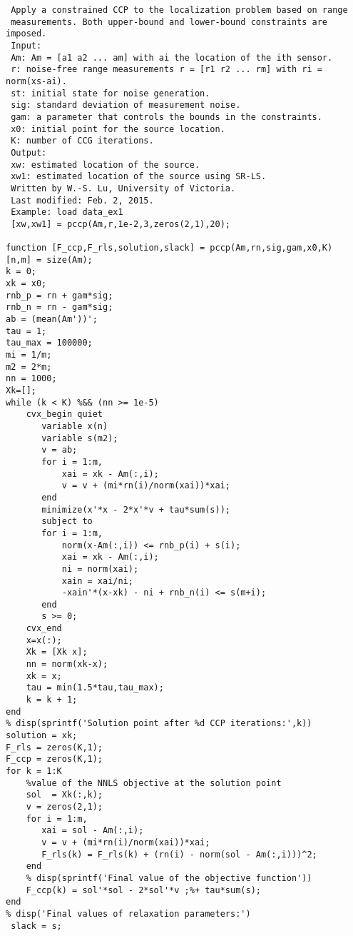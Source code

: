 \begin{lstlisting}
 Apply a constrained CCP to the localization problem based on range
 measurements. Both upper-bound and lower-bound constraints are imposed.
 Input:
 Am: Am = [a1 a2 ... am] with ai the location of the ith sensor.
 r: noise-free range measurements r = [r1 r2 ... rm] with ri = norm(xs-ai).
 st: initial state for noise generation.
 sig: standard deviation of measurement noise.
 gam: a parameter that controls the bounds in the constraints.
 x0: initial point for the source location.
 K: number of CCG iterations.
 Output:
 xw: estimated location of the source.
 xw1: estimated location of the source using SR-LS.
 Written by W.-S. Lu, University of Victoria.
 Last modified: Feb. 2, 2015.
 Example: load data_ex1
 [xw,xw1] = pccp(Am,r,1e-2,3,zeros(2,1),20);
 
function [F_ccp,F_rls,solution,slack] = pccp(Am,rn,sig,gam,x0,K)
[n,m] = size(Am);
k = 0;
xk = x0;
rnb_p = rn + gam*sig;
rnb_n = rn - gam*sig;
ab = (mean(Am'))';
tau = 1;
tau_max = 100000;
mi = 1/m;
m2 = 2*m;
nn = 1000;
Xk=[];
while (k < K) %&& (nn >= 1e-5)
    cvx_begin quiet
       variable x(n)
       variable s(m2);
       v = ab;
       for i = 1:m,
           xai = xk - Am(:,i);
           v = v + (mi*rn(i)/norm(xai))*xai;
       end
       minimize(x'*x - 2*x'*v + tau*sum(s));
       subject to
       for i = 1:m,
           norm(x-Am(:,i)) <= rnb_p(i) + s(i);
           xai = xk - Am(:,i);
           ni = norm(xai);
           xain = xai/ni;
           -xain'*(x-xk) - ni + rnb_n(i) <= s(m+i);
       end
       s >= 0;
    cvx_end
    x=x(:);
    Xk = [Xk x];
    nn = norm(xk-x);
    xk = x;
    tau = min(1.5*tau,tau_max);
    k = k + 1;
end
% disp(sprintf('Solution point after %d CCP iterations:',k))
solution = xk;
F_rls = zeros(K,1);
F_ccp = zeros(K,1);
for k = 1:K
    %value of the NNLS objective at the solution point
    sol  = Xk(:,k);
    v = zeros(2,1);
    for i = 1:m,
       xai = sol - Am(:,i);
       v = v + (mi*rn(i)/norm(xai))*xai;
       F_rls(k) = F_rls(k) + (rn(i) - norm(sol - Am(:,i)))^2;
    end
    % disp(sprintf('Final value of the objective function'))
    F_ccp(k) = sol'*sol - 2*sol'*v ;%+ tau*sum(s);
end
% disp('Final values of relaxation parameters:')
 slack = s;
\end{lstlisting}